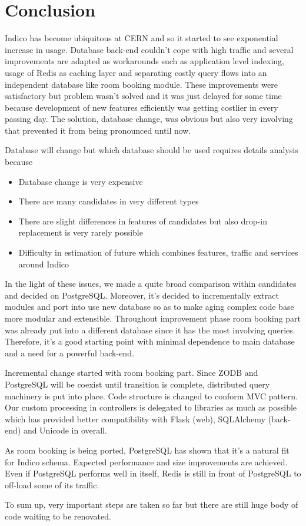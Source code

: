 \chapter{Conclusion}

Indico has become ubiquitous at CERN and so it started to see exponential increase in usage. Database back-end couldn't cope with high traffic and several improvements are adapted as workarounds such as application level indexing, usage of Redis as caching layer and separating costly query flows into an independent database like room booking module. These improvements were satisfactory but problem wasn't solved and it was just delayed for some time because development of new features efficiently was getting costlier in every passing day. The solution, database change, was obvious but also very involving that prevented it from being pronounced until now.

Database will change but which database should be used requires details analysis because 
\begin{itemize}
  \item Database change is very expensive
  \item There are many candidates in very different types
  \item There are slight differences in features of candidates but also drop-in replacement is very rarely possible
  \item Difficulty in estimation of future which combines features, traffic and services around Indico
\end{itemize}

In the light of these issues, we made a quite broad comparison within candidates and decided on PostgreSQL. Moreover, it's decided to incrementally extract modules and port into use new database so as to make aging complex code base more modular and extensible. Throughout improvement phase room booking part was already put into a different database since it has the most involving queries. Therefore, it's a good starting point with minimal dependence to main database and a need for a powerful back-end.

Incremental change started with room booking part. Since ZODB and PostgreSQL will be coexist until transition is complete, distributed query machinery is put into place. Code structure is changed to conform MVC pattern. Our custom processing in controllers is delegated to libraries as much as possible which has provided better compatibility with Flask (web), SQLAlchemy (back-end) and Unicode in overall. 

As room booking is being ported, PostgreSQL has shown that it's a natural fit for Indico schema. Expected performance and size improvements are achieved. Even if PostgreSQL performs well in itself, Redis is still in front of PostgreSQL to off-load some of its traffic.

To sum up, very important steps are taken so far but there are still huge body of code waiting to be renovated. \cite{pronosql}